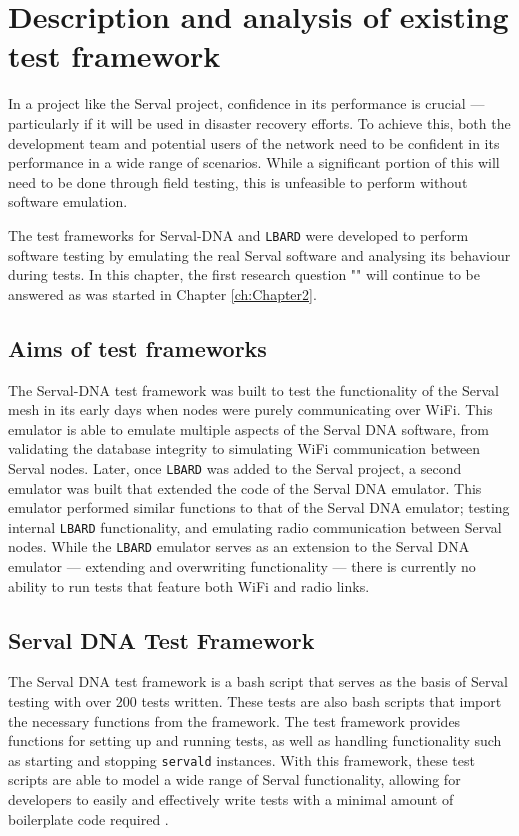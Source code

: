 \chapter{Description and analysis of existing test framework} 
\label{Chapter3} 

In a project like the Serval project, confidence in its performance is crucial — particularly if it will be used in disaster recovery efforts.
To achieve this, both the development team and potential users of the network need to be confident in its performance in a wide range of scenarios. 
While a significant portion of this will need to be done through field testing, this is unfeasible to perform without software emulation.

The test frameworks for Serval-DNA and \texttt{LBARD} were developed to perform software testing by emulating the real Serval software and analysing its behaviour during tests.
In this chapter, the first research question "\firstRQ" will continue to be answered as was started in Chapter \ref{ch:Chapter2}.


\section{Aims of test frameworks}
The Serval-DNA test framework was built to test the functionality of the Serval mesh in its early days when nodes were purely communicating over WiFi. 
This emulator is able to emulate multiple aspects of the Serval DNA software, from validating the database integrity to simulating WiFi communication between Serval nodes. 
Later, once \texttt{LBARD} was added to the Serval project, a second emulator was built that extended the code of the Serval DNA emulator.
This emulator performed similar functions to that of the Serval DNA emulator; testing internal \texttt{LBARD} functionality, and emulating radio communication between Serval nodes. 
While the \texttt{LBARD} emulator serves as an extension to the Serval DNA emulator — extending and overwriting functionality — there is currently no ability to run tests that feature both WiFi and radio links. 


\section{Serval DNA Test Framework}
The Serval DNA test framework is a bash script that serves as the basis of Serval testing with over 200 tests written.
These tests are also bash scripts that import the necessary functions from the framework. 
The test framework provides functions for setting up and running tests, as well as handling functionality such as starting and stopping \texttt{servald} instances.
With this framework, these test scripts are able to model a wide range of Serval functionality, allowing for developers to easily and effectively write tests with a minimal amount of boilerplate code required \parencite{servalTestDocumentation}.

